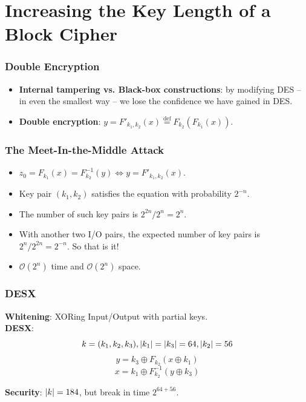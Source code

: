 \section{Increasing the Key Length of a Block Cipher}
\begin{frame}\frametitle{Double Encryption}
\begin{itemize}
\item \textbf{Internal tampering vs. Black-box constructions}: by modifying DES -- in even the smallest way -- we lose the confidence we have gained in DES.
\item \textbf{Double encryption}: $y = F'_{k_1,k_2}(x) \overset{\text{def}}{=} F_{k_2}(F_{k_1}(x))$.
\end{itemize}
\begin{figure}
\begin{center}

\end{center}
\end{figure}
\end{frame}
\begin{frame}\frametitle{The Meet-In-the-Middle Attack}
\begin{figure}
\begin{center}

\end{center}
\end{figure}
\begin{itemize}
\item $z_0 = F_{k_1}(x) = F^{-1}_{k_2}(y) \iff y = F'_{k_1,k_2}(x)$.
\item Key pair $(k_1,k_2)$ satisfies the equation with probability $2^{-n}$.
\item The number of such key pairs is $2^{2n}/2^n = 2^n$.
\item With another two I/O pairs, the expected number of key pairs is $2^{n}/2^{2n}=2^{-n}$. So that is it!
\item $\mathcal{O}(2^n)$ time and $\mathcal{O}(2^n)$ space.
\end{itemize}
\end{frame}
\begin{frame}\frametitle{DESX}
\begin{figure}
\begin{center}

\end{center}
\end{figure}
\textbf{Whitening}: XORing Input/Output with partial keys.\\
\textbf{DESX}:
\[k = (k_1,k_2,k_3), \lvert k_1\rvert=\lvert k_3\rvert=64, \lvert k_2\rvert=56\]
\[y = k_3\oplus F_{k_2}(x \oplus k_1)\]
\[x = k_1\oplus F^{-1}_{k_2}(y \oplus k_3)\]
\newline

\textbf{Security}: $\lvert k\rvert=184$, but break in time $2^{64+56}$.
\end{frame}
